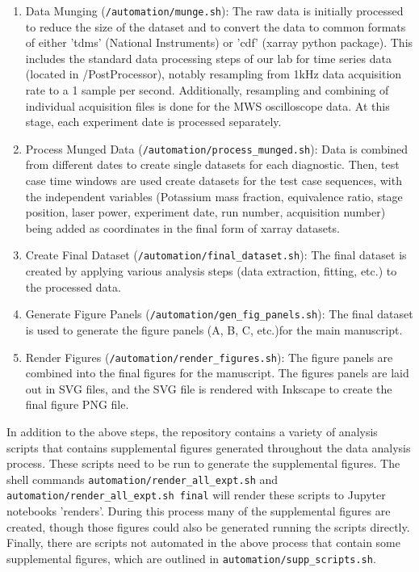 \begin{enumerate}
    \item Data Munging (\texttt{/automation/munge.sh}): The raw data is initially processed to reduce the size of the dataset and to convert the data to common formats of either 'tdms' (National Instruments) or 'cdf' (xarray python package). This includes the standard data processing steps of our lab for time series data (located in /PostProcessor), notably resampling from 1kHz data acquisition rate to a 1 sample per second. Additionally, resampling and combining of individual acquisition files is done for the MWS oscilloscope data.  At this stage, each experiment date is processed separately.
    \item Process Munged Data (\texttt{/automation/process\_munged.sh}): Data is combined from different dates to create single datasets for each diagnostic. Then, test case time windows are used create datasets for the test case sequences, with the independent variables (Potassium mass fraction, equivalence ratio, stage position, laser power, experiment date, run number, acquisition number) being added as coordinates in the final form of xarray datasets.
    \item Create Final Dataset (\texttt{/automation/final\_dataset.sh}): The final dataset is created by applying various analysis steps (data extraction, fitting, etc.) to the processed data. 
    \item Generate Figure Panels (\texttt{/automation/gen\_fig\_panels.sh}): The final dataset is used to generate the figure panels (A, B, C, etc.)for the main manuscript. 
    \item Render Figures (\texttt{/automation/render\_figures.sh}): The figure panels are combined into the final figures for the manuscript. The figures panels are laid out in SVG files, and the SVG file is rendered with Inkscape to create the final figure PNG file. 
\end{enumerate}

In addition to the above steps, the repository contains a variety of analysis scripts that contains supplemental figures generated throughout the data analysis process. These scripts need to be run to generate the supplemental figures. The shell commands \texttt{automation/render\_all\_expt.sh} and \texttt{automation/render\_all\_expt.sh final} will render these scripts to Jupyter notebooks 'renders'. During this process many of the supplemental figures are created, though those figures could also be generated running the scripts directly. Finally, there are scripts not automated in the above process that contain some supplemental figures, which are outlined in \texttt{automation/supp\_scripts.sh}. 

